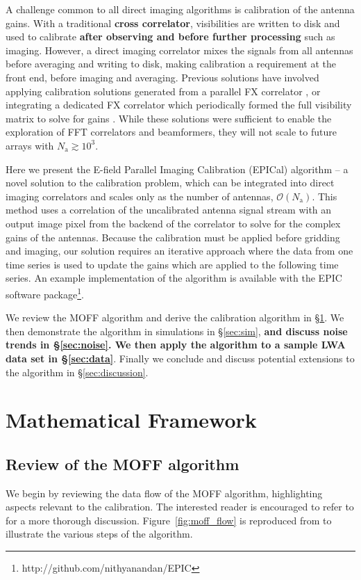 \documentclass[a4paper,fleqn,usenatbib]{../mnras}
\newcommand{\Nant}{\ensuremath{N_{\mathrm{a}}}}
\begin{document}
A challenge common to all direct imaging algorithms is calibration of the antenna gains. With a 
traditional \textbf{cross correlator}, visibilities are written to disk and used to calibrate 
\textbf{after observing and before further processing} such as imaging. However, a direct imaging correlator mixes 
the signals from all antennas before averaging and writing to disk, making calibration a 
requirement at the front end, before imaging and averaging. Previous solutions have involved 
applying calibration solutions generated from a parallel FX correlator \citep{zhe14, fos14}, or 
integrating a dedicated FX correlator which periodically formed the full visibility matrix to solve 
for gains \citep{wij09,dev09}. While these solutions were sufficient to enable the exploration of 
FFT correlators and beamformers, they will not scale to future arrays with $\Nant \gtrsim 10^3$.

Here we present the E-field Parallel Imaging Calibration (EPICal) algorithm -- a novel solution 
to the calibration problem, which can be integrated into direct imaging correlators and scales 
only as the number of antennas, $\mathcal{O}(\Nant)$. This method uses a correlation of the 
uncalibrated antenna signal stream with an output image pixel from the backend of the 
correlator to solve for the complex gains of the antennas. Because the calibration must be 
applied before gridding and imaging, our solution requires an iterative approach where the data 
from one time series is used to update the gains which are applied to the following time series. 
An example implementation of the algorithm is available with the EPIC software 
package\footnote{http://github.com/nithyanandan/EPIC}.

We review the MOFF algorithm and derive the calibration algorithm in \S \ref{sec:math}. We 
then demonstrate the algorithm in simulations in \S \ref{sec:sim}, 
\textbf{and discuss noise trends in \S \ref{sec:noise}. We then apply the algorithm to a sample LWA 
data set in \S \ref{sec:data}}.
Finally we conclude and discuss potential extensions to the 
algorithm in \S \ref{sec:discussion}.

\section{Mathematical Framework}\label{sec:math}
\subsection{Review of the MOFF algorithm}
We begin by reviewing the data flow of the MOFF algorithm, highlighting aspects relevant to 
the calibration. The interested reader is encouraged to refer to \citealt{mor11} for a more 
thorough discussion. Figure~\ref{fig:moff_flow} is reproduced from \citealt{thy15c} to illustrate 
the various steps of the algorithm.
\end{document}
